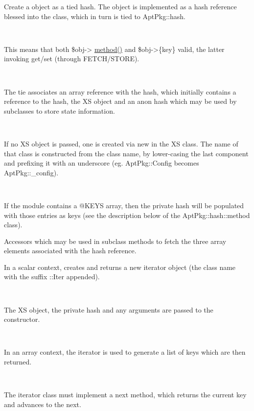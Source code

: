 \documentclass[]{article}
\renewcommand{\emph}[1]{\underline{#1}}
\begin{document}
\begin{description}
\itemsep1pt\parskip0pt
\item[new({[}\emph{XS\_OBJECT}{]})]
Create a object as a tied hash. The object is implemented as a hash
reference blessed into the class, which in turn is tied to AptPkg::hash.

~

This means that both \$obj-\textgreater{} \emph{method()} and
\$obj-\textgreater{}\{key\} valid, the latter invoking get/set (through
FETCH/STORE).

~

The tie associates an array reference with the hash, which initially
contains a reference to the hash, the XS object and an anon hash which
may be used by subclasses to store state information.

~

If no XS object is passed, one is created via new in the XS class. The
name of that class is constructed from the class name, by lower-casing
the last component and prefixing it with an underscore (eg.
AptPkg::Config becomes AptPkg::\_config).

~

If the module contains a @KEYS array, then the private hash will be
populated with those entries as keys (see the description below of the
AptPkg::hash::method class).
\end{description}

\begin{description}
\itemsep1pt\parskip0pt
\item[\_self, \_xs, \_priv]
Accessors which may be used in subclass methods to fetch the three array
elements associated with the hash reference.
\end{description}

\begin{description}
\itemsep1pt\parskip0pt
\item[keys(\emph{ARGS})]
In a scalar context, creates and returns a new iterator object (the
class name with the suffix ::Iter appended).

~

The XS object, the private hash and any arguments are passed to the
constructor.

~

In an array context, the iterator is used to generate a list of keys
which are then returned.

~

The iterator class must implement a next method, which returns the
current key and advances to the next.
\end{description}
\end{document}
